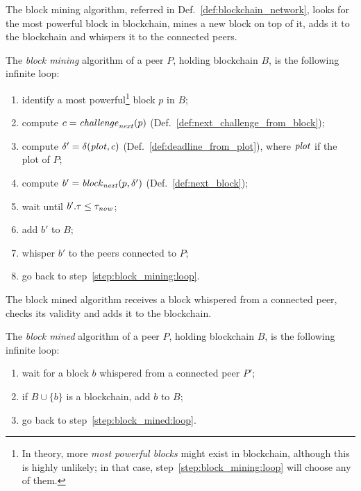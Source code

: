 The block mining algorithm, referred in Def.~\ref{def:blockchain_network},
looks for the most powerful block in blockchain,
mines a new block on top of it, adds it to the blockchain and whispers it to the connected peers.
%
\begin{alg}\label{alg:block_mining}
  The \emph{block mining} algorithm of a peer $P$, holding blockchain $B$,
  is the following infinite loop:
  \begin{enumerate}
  \item\label{step:block_mining:loop} identify a most powerful\footnote{In theory, more \emph{most powerful blocks} might exist in blockchain, although this is highly unlikely; in that case, step~\ref{step:block_mining:loop} will choose any of them.} block $p$ in $B$;
  \item\label{step:block_mining:next_challenge} compute $c={\mathit{challenge}}_{\mathit{next}}(p)$ (Def.~\ref{def:next_challenge_from_block});
  \item\label{step:block_mining:next_deadline} compute $\delta'=\delta({\mathit{plot}},c)$ (Def.~\ref{def:deadline_from_plot}), where ${\mathit{plot}}$
    if the plot of $P$;
  \item\label{step:block_mining:next_block} compute $b'={\mathit{block}}_{\mathit{next}}(p,\delta')$ (Def.~\ref{def:next_block});
  \item\label{step:block_mining:wait} wait until $b'.\tau\le\tau_{\mathit{now}}$;
  \item\label{step:block_mining:add} add $b'$ to $B$;
  \item whisper $b'$ to the peers connected to $P$;
  \item go back to step~\ref{step:block_mining:loop}.
  \end{enumerate}
\end{alg}
%
The block mined algorithm receives a block whispered from a connected peer, checks its validity
and adds it to the blockchain.
%
\begin{alg}\label{alg:block_mined}
  The \emph{block mined} algorithm of a peer $P$, holding blockchain $B$,
  is the following infinite loop:
  \begin{enumerate}
  \item\label{step:block_mined:loop} wait for a block $b$ whispered from a connected peer $P'$;
  \item\label{step:block_mined:add} if $B\cup\{b\}$ is a blockchain, add $b$ to $B$;
  \item go back to step~\ref{step:block_mined:loop}.
  \end{enumerate}
\end{alg}
